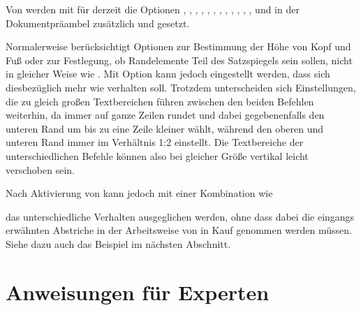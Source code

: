 {\setlength{\emergencystretch}{1em}%
Von  werden mit  für 
derzeit die Optionen
, , ,
, , ,
, , ,
, , , 
und in der Dokumentpräambel zusätzlich  und
 gesetzt.\par}%
\EndIndexGroup


\begin{Declaration}
\end{Declaration}
Normalerweise berücksichtigt  Optionen zur
Bestimmung der Höhe von Kopf und Fuß oder zur Festlegung, ob Randelemente Teil
des Satzspiegels sein sollen, nicht in gleicher Weise wie
. Mit Option
 kann jedoch
eingestellt werden, dass sich  diesbezüglich
mehr wie  verhalten soll. Trotzdem
unterscheiden sich Einstellungen, die zu gleich großen Textbereichen führen
zwischen den beiden Befehlen weiterhin, da 
immer auf ganze Zeilen rundet und dabei gegebenenfalls den unteren Rand um bis
zu eine Zeile kleiner wählt, während  den oberen
und unteren Rand immer im Verhältnis 1:2 einstellt.  Die Textbereiche der
unterschiedlichen Befehle können also bei gleicher Größe vertikal leicht
verschoben sein.

Nach Aktivierung von  kann jedoch mit einer
Kombination wie
\begin{lstcode}[escapeinside=><]
\end{lstcode}
das unterschiedliche Verhalten ausgeglichen werden, ohne dass dabei die
eingangs erwähnten Abstriche in der Arbeitsweise von  in Kauf
genommen werden müssen. Siehe dazu auch das Beispiel im nächsten Abschnitt.%
\EndIndexGroup


\section{Anweisungen für Experten}



